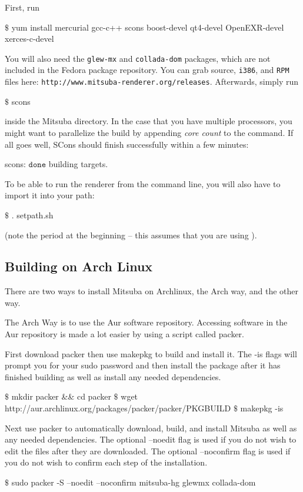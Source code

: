 First, run
\begin{shell}
$\text{\$}$ yum install mercurial gcc-c++ scons boost-devel qt4-devel OpenEXR-devel xerces-c-devel
\end{shell}
You will also need the \texttt{glew-mx} and \texttt{collada-dom} packages, which are not included in the Fedora package repository. 
You can grab source, \texttt{i386}, and  \texttt{RPM} files here: \texttt{http://www.mitsuba-renderer.org/releases}.
Afterwards, simply run
\begin{shell}
$\text{\$}$ scons
\end{shell}
inside the Mitsuba directory. In the case that you have multiple processors, you might want to parallelize the build by appending \emph{core count} to the command.
If all goes well, SCons should finish successfully within a few minutes:
\begin{shell}
scons: $\texttt{done}$ building targets.
\end{shell}
To be able to run the renderer from the command line, you will also have to import it into your path:
\begin{shell}
$\text{\$}$ . setpath.sh
\end{shell}
(note the period at the beginning -- this assumes that you are using ).

\subsection{Building on Arch Linux}
There are two ways to install Mitsuba on Archlinux, the Arch way, and the other way.

The Arch Way is to use the Aur software repository. 
Accessing software in the Aur repository is made a lot easier by using a script called packer.

First download packer then use makepkg to build and install it. 
The -is flags will prompt you for your sudo password and then install the package after it has finished building as well as install any needed dependencies.
\begin{shell}
$\text{\$}$ mkdir packer && cd packer
$\text{\$}$ wget http://aur.archlinux.org/packages/packer/packer/PKGBUILD
$\text{\$}$ makepkg -is
\end{shell}

Next use packer to automatically download, build, and install Mitsuba as well as any needed dependencies.
The optional --noedit flag is used if you do not wish to edit the files after they are downloaded.
The optional --noconfirm flag is used if you do not wish to confirm each step of the installation. 
\begin{shell}
$\text{\$}$ sudo packer -S --noedit --noconfirm mitsuba-hg glewmx collada-dom
\end{shell}

